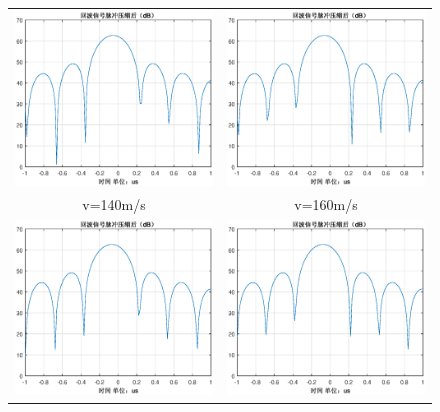 \documentclass[12pt]{article}
\begin{document}
\begin{figure}[htbp]
  \centering
  \begin{tabular}{cc}
    \includegraphics[width=.5\textwidth]{Doppler_sensitivity_0140}&\includegraphics[width=.5\textwidth]{Doppler_sensitivity_0160}\\
    v=140m/s&v=160m/s\\
    \includegraphics[width=.5\textwidth]{Doppler_sensitivity_0180}&\includegraphics[width=.5\textwidth]{Doppler_sensitivity_0200}\\

\end{tabular}
\end{figure}
\end{document}

